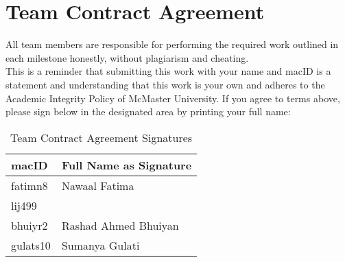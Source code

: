 \documentclass[titlepage]{article}
\begin{document}
\newpage
\section{Team Contract Agreement}
All team members are responsible for performing the required work
outlined in each milestone honestly, without plagiarism and cheating.\\

This is a reminder that submitting this work with your name and macID is a statement 
and understanding that this work is your own and adheres to the Academic Integrity Policy 
of McMaster University. If you agree to terms above, please sign below in the designated 
area by printing your full name:
\begin{table}[H]
    \centering
    \begin{tabular}{|l|l|}
    \hline
    \textbf{macID} & \textbf{Full Name as Signature} \\ \hline
    fatimn8 & Nawaal Fatima          \\ \hline
    lij499  &                        \\ \hline
    bhuiyr2 &  Rashad Ahmed Bhuiyan                      \\ \hline
    gulats10 & Sumanya Gulati         \\ \hline
    \end{tabular}
    \caption{Team Contract Agreement Signatures}
    \label{tab:team-signatures}
    \end{table}
\end{document}
